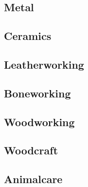 \subsection{Metal}\label{subsec:metal}
\subsection{Ceramics}\label{subsec:ceramics}
\subsection{Leatherworking}\label{subsec:leatherworking}
\subsection{Boneworking}\label{subsec:boneworking}
\subsection{Woodworking}\label{subsec:woodworking}
\subsection{Woodcraft}\label{subsec:woodcraft}
\subsection{Animalcare}\label{subsec:animalcare}